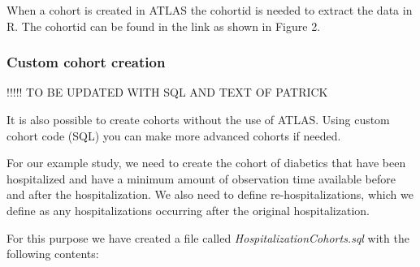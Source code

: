 \documentclass[]{article}
\begin{document}
When a cohort is created in ATLAS the cohortid is needed to extract the
data in R. The cohortid can be found in the link as shown in Figure 2.

\subsubsection{Custom cohort creation}\label{custom-cohort-creation}

!!!!! TO BE UPDATED WITH SQL AND TEXT OF PATRICK

It is also possible to create cohorts without the use of ATLAS. Using
custom cohort code (SQL) you can make more advanced cohorts if needed.

For our example study, we need to create the cohort of diabetics that
have been hospitalized and have a minimum amount of observation time
available before and after the hospitalization. We also need to define
re-hospitalizations, which we define as any hospitalizations occurring
after the original hospitalization.

For this purpose we have created a file called
\emph{HospitalizationCohorts.sql} with the following contents:
\end{document}
